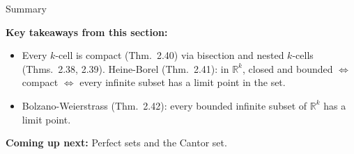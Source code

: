 \documentclass[aspectratio=169,12pt,t]{beamer}
\begin{document}
{%
\begin{frame}{Summary}
  \begin{hlbox}
    \textbf{Key takeaways from this section:}
    \begin{itemize}
      \item Every $k$-cell is compact (Thm.\ 2.40) via \alert{bisection} and
        nested $k$-cells (Thms.\ 2.38, 2.39). \alert{Heine-Borel}
        (Thm.\ 2.41): in $\mathbb{R}^k$, closed and bounded $\iff$ compact
        $\iff$ every infinite subset has a limit point in the set.
      \item \alert{Bolzano-Weierstrass} (Thm.\ 2.42): every bounded infinite
        subset of $\mathbb{R}^k$ has a limit point.
    \end{itemize}

    \vspace{0.5em}
    \textbf{Coming up next:} Perfect sets and the Cantor set.
  \end{hlbox}

\end{frame}
}
\end{document}
